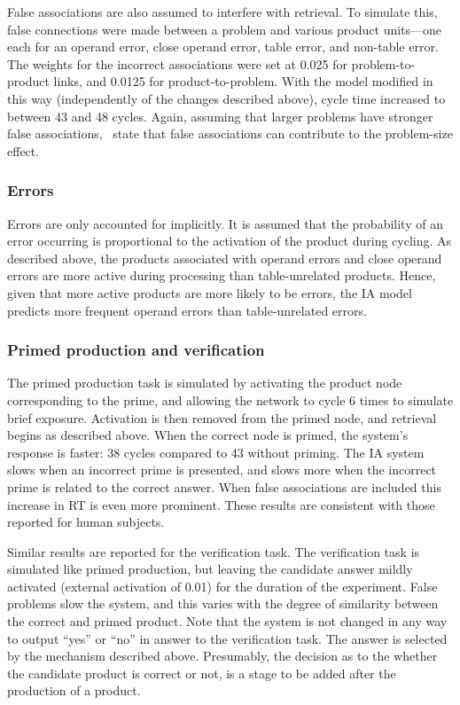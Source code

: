 False associations are also assumed to interfere with retrieval.  To
simulate this, false connections were made between a problem and various
product units---one each for an operand error, close operand error,
table error, and non-table error.  The weights for the incorrect
associations were set at 0.025 for problem-to-product links,
and 0.0125 for
product-to-problem.  With the model modified in this way (independently of
the changes described above), cycle time increased to between 43 and 48
cycles.
Again, assuming that larger problems have
stronger false associations, \citeauthor{rickinte}\ state that false
associations can contribute to the problem-size effect.

\subsubsection{Errors}

Errors are only accounted for implicitly.  It is assumed that the
probability of an error occurring is proportional to the activation of the
product during cycling. As described above, the products
associated with operand errors and close operand errors are more active
during processing than table-unrelated products. Hence, given that more
active products are more likely to be errors, the IA model predicts more
frequent operand errors than table-unrelated errors.

\subsubsection{Primed production and verification}

The primed production task is simulated by activating the product node
corresponding to the prime, and allowing the network to cycle 6 times to
simulate brief exposure. Activation is then removed from the primed node,
and retrieval begins as described above.  When the correct node is primed,
the system's response is faster: 38 cycles compared to 43 without priming.
The IA system
slows when an incorrect prime is presented, and slows more when the
incorrect prime is related to the correct answer. When false associations
are included this increase in RT is even more
prominent. These results are consistent with those reported for human
subjects.

Similar results are reported for the verification task.  The verification
task is simulated like primed production, but leaving the candidate answer
mildly activated (external activation of 0.01) for the duration of the
experiment.  False problems slow the system, and this varies with the
degree of similarity between the correct and primed product.
Note that the system is not changed in any way to output
``yes'' or ``no'' in answer to the verification task. The answer is
selected by the mechanism described above.
Presumably, the decision as
to the
whether the candidate
product is correct or not, is a stage to be added after the production of a
product.


